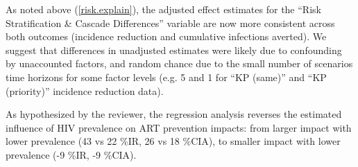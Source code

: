 \begin{comment}
Please elaborate on and support Figure C.11 - it's not immediately clear to me that 'the pattern of incidence reduction versus modelled heterogeneity was similar to the pattern of infections averted versus modelled heterogeneity". Recognising that these data do not stem from the same studies, it is noted that in Table C.1 the incidence reduction increases ~2fold between no risk heterogeneity and activity (no KP), whilst averted infections decreases \textasciitilde4 fold. This would appear to be a key difference?
\end{comment}
\begin{response}
As noted above (\ref{risk.explain}), the adjusted effect estimates for
the ``Risk Stratification \& Cascade Differences'' variable are now more consistent across both outcomes
(incidence reduction and cumulative infections averted).
We suggest that differences in unadjusted estimates were likely due to confounding by unaccounted factors,
and random chance due to the small number of scenarios time horizons for some factor levels
(e.g. 5 and 1 for ``KP (same)'' and ``KP (priority)'' incidence reduction data).
\end{response}
\begin{comment}
As HIV prevalence is linked to epidemic type, it's interesting that ART prevention impacts were larger with lower HIV prevalence. As the lower prevalence epidemics in West Africa are driven by KPs/more so than the epidemics in ESA, I assume that modelling studies in West Africa are more likely to be KP-disaggregated. However, you have shown that KP-disaggregated models estimate smaller ART prevention impacts. Could this be explored further?
\end{comment}
\begin{response}
As hypothesized by the reviewer,
the regression analysis reverses the estimated influence of HIV prevalence on ART prevention impacts:
from larger impact with lower prevalence (43 vs 22 \%IR, 26 vs 18 \%CIA),
to smaller impact with lower prevalence (-9 \%IR, -9 \%CIA).
\end{response}
\begin{comment}
Whilst recognising this is a scoping review, some more discussion on the impact of these findings for the global HIV response would be welcome. As noted in the discussion, modelled estimates "did not always reflect the available data". The key population estimates (and subsequent estimates of averted HIV transmission) are reliant on weak data and some informed comment on how these results should be used would be good.
\end{comment}
